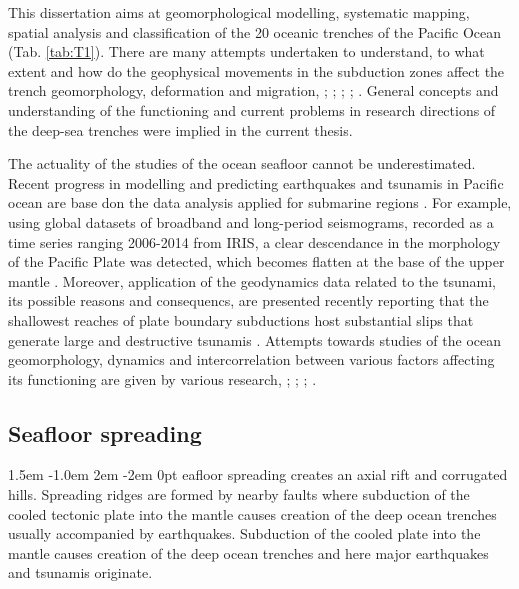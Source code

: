 \documentclass[11pt,a4paper]{report}
\def\pstart#1{\noindent\smash{\lower1.5ex\hbox{\llap{\Cal#1}}\hskip-.1ex}
  \parshape=3 1.5em \dimexpr\hsize-1.0em 2em \dimexpr\hsize-2em 0pt \hsize}
\begin{document}
This dissertation aims at geomorphological modelling, systematic mapping, spatial analysis and classification of the 20 oceanic trenches of the Pacific Ocean (Tab. \ref{tab:T1}). There are many attempts undertaken to understand, to what extent and how do the geophysical movements in the subduction zones affect the trench geomorphology, deformation and migration, \cite{Doglioni2009}; \cite{FernandezMarques2018}; \cite{Gorbatovetal2001}; \cite{Hubbleetal2016}; \cite{Lemoineetal2002}. General concepts and understanding of the functioning and current problems in research directions of the deep-sea trenches were implied in the current thesis. 

The actuality of the studies of the ocean seafloor cannot be underestimated. Recent progress in modelling and predicting earthquakes and tsunamis in Pacific ocean are base don the data analysis applied for submarine regions \cite{Kongetal2017}. For example, using global datasets of broadband and long-period seismograms, recorded as a time series ranging 2006-2014 from \ac{IRIS}, a clear descendance in the morphology of the Pacific Plate was  detected, which becomes flatten at the base of the upper mantle \cite{Dokhtetal2016}. Moreover, application of the geodynamics data related to the tsunami, its possible reasons and consequencs, are presented recently reporting that the shallowest reaches of plate boundary subductions host substantial slips that generate large and destructive tsunamis \cite{Ikarietal2015}. Attempts towards studies of the ocean geomorphology, dynamics and intercorrelation between various factors affecting its functioning are given by various research, \cite{Maoetal2016}; \cite{Masson1991};  \cite{Luoetal2018}; \cite{Loheretal2018}.

\subsection{Seafloor spreading}
\pstart Seafloor spreading creates an axial rift and corrugated hills. Spreading ridges are formed by nearby faults where subduction of the cooled tectonic plate into the mantle causes creation of the deep ocean trenches usually accompanied by earthquakes. Subduction of the cooled plate into the mantle causes creation of the deep ocean trenches and here major earthquakes and tsunamis originate. 
\end{document}
